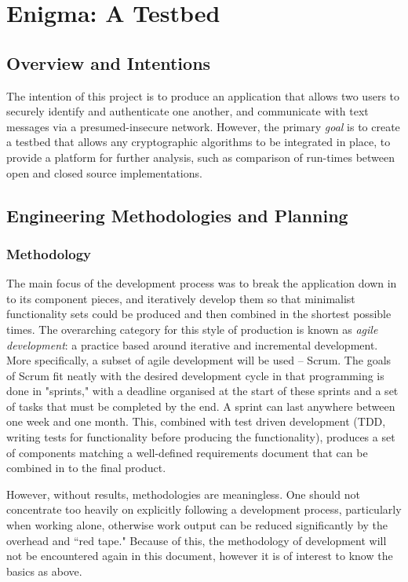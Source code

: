 
\chapter{Enigma: A Testbed} 
\label{Chapter6}

\section{Overview and Intentions}

The intention of this project is to produce an application that allows two users to securely identify and authenticate one another, and communicate with text messages via a presumed-insecure network. However, the primary \emph{goal} is to create a testbed that allows any cryptographic algorithms to be integrated in place, to provide a platform for further analysis, such as comparison of run-times between open and closed source implementations.

\section{Engineering Methodologies and Planning}

\subsection{Methodology}

The main focus of the development process was to break the application down in to its component pieces, and iteratively develop them so that minimalist functionality sets could be produced and then combined in the shortest possible times. The overarching category for this style of production is known as \emph{agile development}: a practice based around iterative and incremental development. More specifically, a subset of agile development will be used -- Scrum. The goals of Scrum fit neatly with the desired development cycle in that programming is done in "sprints," with a deadline organised at the start of these sprints and a set of tasks that must be completed by the end. A sprint can last anywhere between one week and one month. This, combined with test driven development (TDD, writing tests for functionality before producing the functionality), produces a set of components matching a well-defined requirements document that can be combined in to the final product.

However, without results, methodologies are meaningless. One should not concentrate too heavily on explicitly following a development process, particularly when working alone, otherwise work output can be reduced significantly by the overhead and ``red tape." Because of this, the methodology of development will not be encountered again in this document, however it is of interest to know the basics as above.

